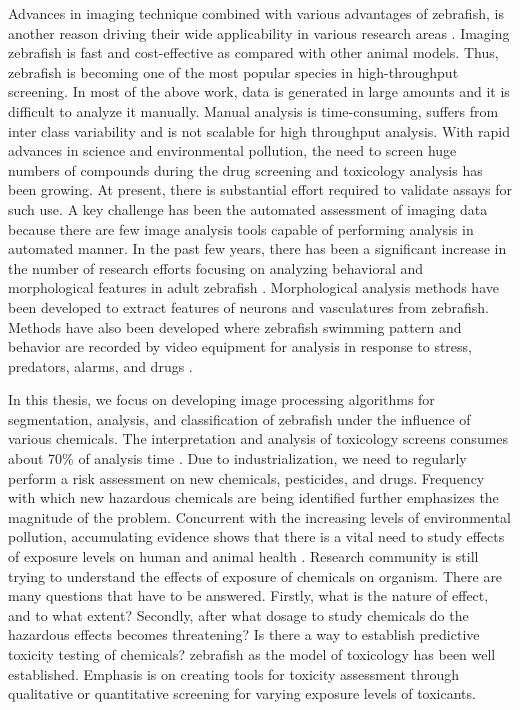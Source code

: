 \par
Advances in imaging technique combined with various advantages of zebrafish, is another reason driving their wide applicability in various research areas \cite{Leonard05}. Imaging zebrafish is fast and cost-effective as compared with other animal models. Thus, zebrafish is becoming one of the most popular species in high-throughput screening. In most of the above work, data is generated in large amounts and it is difficult to analyze it manually. Manual analysis is time-consuming, suffers from inter class variability and is not scalable for high throughput analysis. With rapid advances in science and environmental pollution, the need to screen huge numbers of compounds during the drug screening and toxicology analysis has been growing. At present, there is substantial effort required to validate assays for such use. A key challenge has been the automated assessment of imaging data because there are few image analysis tools capable of performing analysis in automated manner. In the past few years, there has been a significant increase in the number of research efforts focusing on analyzing behavioral and morphological features in adult zebrafish \cite{Liu06}. Morphological analysis methods have been developed to extract features of neurons \cite{Kimmel95} and vasculatures \cite{Feng05} from zebrafish. Methods have also been developed where zebrafish swimming pattern and behavior are recorded by video equipment for analysis in response to stress, predators, alarms, and drugs \cite{Bang02}. 

In this thesis, we focus on developing image processing algorithms for segmentation, analysis, and classification of zebrafish under the influence of various chemicals. The interpretation and analysis of toxicology screens consumes about 70\% of analysis time \cite{alshut2010}. Due to industrialization, we need to regularly perform a risk assessment on new chemicals, pesticides, and drugs. Frequency with which new hazardous chemicals are being identified further emphasizes the magnitude of the problem. Concurrent with the increasing levels of environmental pollution, accumulating evidence shows that there is a vital need to study effects of exposure levels on human and animal health \cite{mccollum2014}. Research community is still trying to understand the effects of exposure of chemicals on organism. There are many questions that have to be answered. Firstly, what is the nature of effect, and to what extent? Secondly, after what dosage to study chemicals do the hazardous effects becomes threatening? Is there a way to establish predictive toxicity testing of chemicals? zebraﬁsh as the model of toxicology has been well established. Emphasis is on creating tools for toxicity assessment through qualitative or quantitative screening for varying exposure levels of toxicants.


